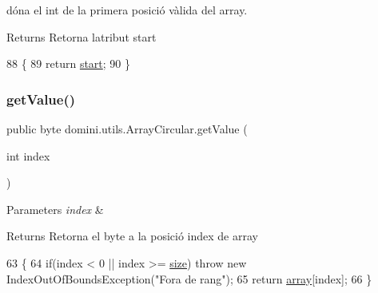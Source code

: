 dóna el int de la primera posició vàlida del array. 

\begin{DoxyReturn}{Returns}
Retorna l\textquotesingle{}atribut start 
\end{DoxyReturn}

\begin{DoxyCode}
88     \{
89         \textcolor{keywordflow}{return} \hyperlink{classdomini_1_1utils_1_1ArrayCircular_a5206ac4a02c25c16c8a8ed50f65ea87b}{start};
90     \}
\end{DoxyCode}
\mbox{\label{classdomini_1_1utils_1_1ArrayCircular_acbed36ebcc550922c4485c19ce5be53e}} 
\subsubsection{\texorpdfstring{get\+Value()}{getValue()}}
{\footnotesize\ttfamily public byte domini.\+utils.\+Array\+Circular.\+get\+Value (\begin{DoxyParamCaption}\item[{int}]{index }\end{DoxyParamCaption})\hspace{0.3cm}{\ttfamily [inline]}}


\begin{DoxyParams}{Parameters}
{\em index} & \\
\hline
\end{DoxyParams}
\begin{DoxyReturn}{Returns}
Retorna el byte a la posició index de array 
\end{DoxyReturn}

\begin{DoxyCode}
63     \{
64         \textcolor{keywordflow}{if}(index < 0 || index >= \hyperlink{classdomini_1_1utils_1_1ArrayCircular_a1ffca5e28ff4dc515eddde9cd5926efd}{size}) \textcolor{keywordflow}{throw} \textcolor{keyword}{new} IndexOutOfBoundsException(\textcolor{stringliteral}{"Fora de rang"});
65         \textcolor{keywordflow}{return} \hyperlink{classdomini_1_1utils_1_1ArrayCircular_a2af77a58adf605b58d79a1879a0a593f}{array}[index];
66     \}
\end{DoxyCode}
\mbox{\label{classdomini_1_1utils_1_1ArrayCircular_aa36c40061ff0f3ea0ae15f5b06900e94}} 
